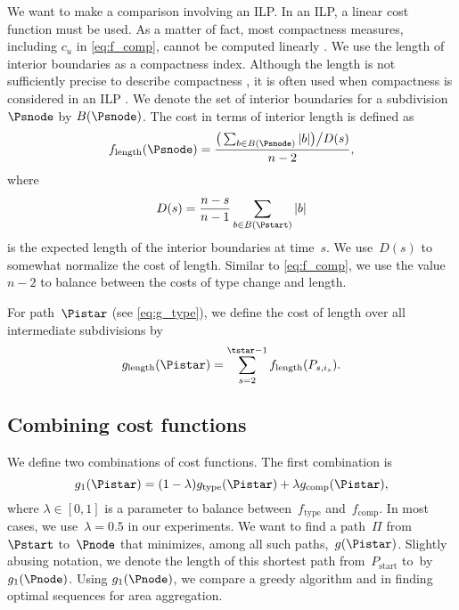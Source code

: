 We want to make a comparison involving an ILP.
In an ILP, a linear cost function must be used.
As a matter of fact, most compactness measures, 
including $c_u$ in \eq\ref{eq:f_comp}, 
cannot be computed linearly
\parencite[see more measures in][]{Maceachren1985}.
We use the length of interior boundaries as a compactness index.
Although the length is not sufficiently precise 
to describe compactness 
\parencite[see for example][]{Young1988}, 
it is often used when compactness is considered in an ILP
\parencite[e.g.,][]{Minas2016,HaunertWolff2010AreaAgg,Wright1983}.
We denote the set of interior boundaries for a subdivision
$\Psnode$ by $B(\Psnode)$.
The cost in terms of interior length is defined as
\begin{equation}
\label{eq:f_length}
f_{\mathrm{length}}(\Psnode)=
\frac{\big(\sum_{b\in B (\Psnode)} 
|b|\big)\big/D(s)}{n-2}, 
\end{equation} 
where 
\begin{equation}
\label{eq:AreaAgg_Norm}
D(s)=\frac{n-s}{n-1} \sum_{b\in B (\Pstart)} |b|
\end{equation}
is the expected length of the interior boundaries at time~$s$. 
We use~$D(s)$ to somewhat normalize the cost of length. 
Similar to \eq\ref{eq:f_comp}, 
we use the value~$n-2$ 
to balance between the costs of type change and length.

For path~$\Pistar$ (see \eq\ref{eq:g_type}), 
we define the cost of length over all 
intermediate subdivisions by
\begin{equation}
\label{eq:g_length}
g_\mathrm{length}(\Pistar)=
\sum_{s=2}^{\tstar-1}f_{\mathrm{length}}(P_{s,i_s}).
\end{equation}



\subsection{Combining cost functions}
\label{sec:AreaAgg_Combining}
We define two combinations of cost functions.
The first combination is
\begin{equation}
\label{eq:g_1}
g_1(\Pistar)= (1-\lambda)g_\mathrm{type}(\Pistar)
+\lambda g_\mathrm{comp}(\Pistar),
\end{equation}
where $\lambda \in [0,1]$ is a parameter to balance 
between~$f_\mathrm{type}$ and~$f_\mathrm{comp}$.
In most cases, we use~$\lambda=0.5$ in our experiments. 
We want to find a path~$\Pi$ from~$\Pstart$ to~$\Pnode$ 
that minimizes, among all such paths,~$g(\Pistar)$.
Slightly abusing notation, we denote the length of
this shortest path from~${P}_{\mathrm{start}}$ to~\Pnode by~$g_1(\Pnode)$.
Using $g_1(\Pnode)$, we compare a greedy algorithm and \Astar
in finding optimal sequences for area aggregation.

